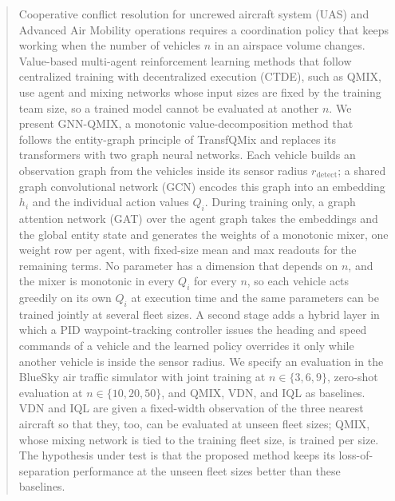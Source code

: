 \begin{abstract}
Cooperative conflict resolution for uncrewed aircraft system (UAS) and Advanced Air Mobility
operations requires a coordination policy that keeps working when the number of vehicles $n$
in an airspace volume changes. Value-based multi-agent reinforcement learning methods that
follow centralized training with decentralized execution (CTDE), such as QMIX, use agent
and mixing networks whose input sizes are fixed by the training team size, so a trained
model cannot be evaluated at another $n$. We present GNN-QMIX, a monotonic value-decomposition
method that follows the entity-graph principle of TransfQMix and replaces its transformers
with two graph neural networks. Each vehicle builds an observation graph from the vehicles
inside its sensor radius $r_{\text{detect}}$; a shared graph convolutional network (GCN)
encodes this graph into an embedding $h_i$ and the individual action values $Q_i$. During
training only, a graph attention network (GAT) over the agent graph takes the embeddings
and the global entity state and generates the weights of a monotonic mixer, one weight row
per agent, with fixed-size mean and max readouts for the remaining terms. No parameter has
a dimension that depends on $n$, and the mixer is monotonic in every $Q_i$ for every $n$, so
each vehicle acts greedily on its own $Q_i$ at execution time and the same parameters can
be trained jointly at several fleet sizes. A second stage adds a hybrid layer in which a
PID waypoint-tracking controller issues the heading and speed commands of a vehicle and the
learned policy overrides it only while another vehicle is inside the sensor radius. We
specify an evaluation in the BlueSky air traffic simulator with joint training at
$n\in\{3,6,9\}$, zero-shot evaluation at $n\in\{10,20,50\}$, and QMIX, VDN, and IQL as
baselines. VDN and IQL are given a fixed-width observation of the three nearest aircraft so that
they, too, can be evaluated at unseen fleet sizes; QMIX, whose mixing network is tied to the
training fleet size, is trained per size. The hypothesis under test is that the proposed
method keeps its loss-of-separation performance at the unseen fleet sizes better than these
baselines.
\end{abstract}
